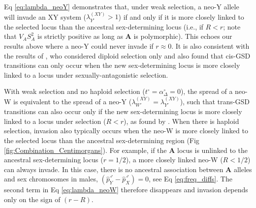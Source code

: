 \documentclass[10pt,letterpaper]{article}
\begin{document}
Eq \eqref{eq:lambda_neoY} demonstrates that, under weak selection, a neo-Y allele will invade an XY system ($\lambda_{Y'}^{(XY)}>1$) if and only if it is more closely linked to the selected locus than the ancestral sex-determining locus (i.e., if $R<r$; note that $V_{A}S_{A}^2$ is strictly positive as long as $\mathbf{A}$ is polymorphic). 
This echoes our results above where a neo-Y could never invade if $r\approx0$. 
It is also consistent with the results of \cite{vanDoorn:2007eu}, who considered diploid selection only and also found that cis-GSD transitions can only occur when the new sex-determining locus is more closely linked to a locus under sexually-antagonistic selection. 

With weak selection and no haploid selection ($t^\circ=\alpha^\circ_{\Delta}=0$), the spread of a neo-W is equivalent to the spread of a neo-Y ($\lambda_{W'}^{(XY)}=\lambda_{Y'}^{(XY)}$), such that trans-GSD transitions can also occur only if the new sex-determining locus is more closely linked to a locus under selection ($R<r$), as found by \cite{vanDoorn:2010hu}. 
When there is haploid selection, invasion also typically occurs when the neo-W is more closely linked to the selected locus than the ancestral sex-determining region (Fig \ref{fig:Combination_Centimorgans}).
For example, if the $\mathbf{A}$ locus is unlinked to the ancestral sex-determining locus ($r=1/2$), a more closely linked neo-W ($R<1/2$) can always invade.
In this case, there is no ancestral association between $\mathbf{A}$ alleles and sex chromosomes in males, $\left( \hat{p}^\male_Y-\hat{p}^\male_X \right)=0$, see Eq \eqref{eq:freq_diffs}. 
The second term in Eq \eqref{eq:lambda_neoW} therefore disappears and invasion depends only on the sign of $(r-R)$.%
\end{document}
